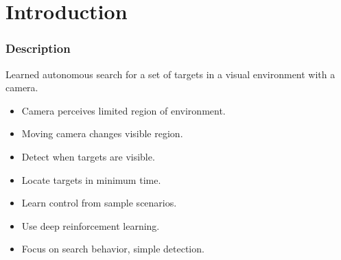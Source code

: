 
\section{Introduction}

\begin{frame}
    \frametitle{Description}
    
    Learned autonomous search for a set of targets in a visual environment with a camera.

    \begin{itemize}
        \item Camera perceives limited region of environment.
        \item Moving camera changes visible region.
        \item Detect when targets are visible.
        \item Locate targets in minimum time.
        \item Learn control from sample scenarios.
        \item Use deep reinforcement learning.
        \item Focus on search behavior, simple detection.
    \end{itemize}
\end{frame}

